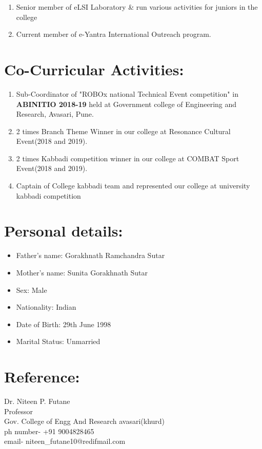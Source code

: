 \documentclass[margin,line]{res}
\begin{document}
\begin{resume}
\begin{enumerate}
\item{Senior member of eLSI Laboratory & run various activities for juniors in the college}
     \item{Current member of e-Yantra International Outreach program.}
    
\end{enumerate}
\hfill




{\section{\Large\bf{Co-Curricular Activities:}}}
\begin{enumerate}
	\item{Sub-Coordinator of "ROBOx national Technical Event competition" in  \textbf{ABINITIO 2018-19} held at Government college of Engineering and Research, Avasari, Pune.
}
\item{
2 times Branch Theme Winner in our college at Resonance Cultural Event(2018 and 2019). 
}

	\item{2 times Kabbadi competition winner in our college at COMBAT Sport Event(2018 and  2019).}
     \item{Captain of College kabbadi team and represented our college at university kabbadi competition}
    
\end{enumerate}
\hfill


{\section{\Large\bf{Personal details:}}}
\begin{itemize}
	\item{Father's name: Gorakhnath Ramchandra Sutar}
	\item{Mother's name: Sunita Gorakhnath Sutar}
	\item{Sex: Male} 
	\item{Nationality: Indian} 
	\item{Date of Birth: 29th June 1998} 
\item{Marital Status: Unmarried }
\end{itemize}
\hfil



{\section{\Large \bf{Reference:}}} 
Dr. Niteen P. Futane\\
Professor\\
Gov. College of Engg And Research avasari(khurd)\\
ph number- +91 9004828465\\
email- niteen\_futane10@redifmail.com\\
\hfill


\end{resume}
\end{document}
